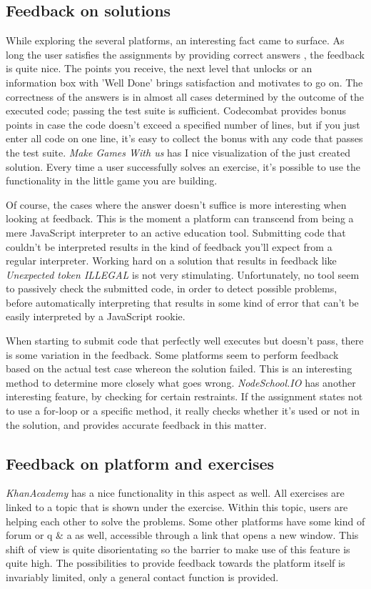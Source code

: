\documentclass{article}
\begin{document}
\subsection{Feedback on solutions}
While exploring the several platforms, an interesting fact came to
surface. As long the user satisfies the assignments by providing correct answers
, the feedback is quite nice. The points you receive, the next level that
unlocks or an information box with 'Well Done' brings satisfaction and motivates
to go on. The correctness of the answers is in almost all cases determined by
the outcome of the executed code; passing the test suite is sufficient.
Codecombat provides bonus points in case the code doesn't exceed a specified 
number of lines, but if you just enter all code on one line, it's easy to 
collect the bonus with any code that passes the test suite. 
{\em Make Games With us} has I nice
visualization of the just created solution. Every time a user successfully solves
an exercise, it's possible to use the functionality in the little game you are
building.


Of course, the cases where the answer doesn't suffice is more interesting when
looking at feedback. This is the moment a platform can transcend from being a
mere JavaScript interpreter to an active education tool. Submitting code that 
couldn't be interpreted results in the kind of feedback you'll expect from a 
regular interpreter. Working hard on a solution that results in feedback like 
{\em Unexpected token ILLEGAL} is not very stimulating. Unfortunately, no tool 
seem to passively check the submitted code, in order to detect possible
problems, before automatically interpreting that results in some kind of error
that can't be easily interpreted by a JavaScript rookie. 


When starting to submit code that perfectly well executes but doesn't
pass, there is
some variation in the feedback. Some platforms seem to perform feedback based 
on the actual test case whereon the solution failed. This is an interesting 
method to determine more closely what goes wrong. {\em NodeSchool.IO} has another 
interesting feature, by checking for certain restraints. If the assignment 
states not to use a for-loop or a specific method, it really checks whether 
it's used or not in the solution, and provides accurate feedback in this matter.

\subsection{Feedback on platform and exercises}
{\em KhanAcademy} has a nice functionality in this aspect as well. All exercises are 
linked to a topic that is shown under the exercise. Within this topic, users are 
helping each other to solve the problems. Some other platforms have some kind
of forum or q \& a as well, accessible through a link that opens a new window. 
This shift of view is quite disorientating so the barrier to make use 
of this feature is quite high. The possibilities to provide feedback towards the 
platform itself is invariably limited, only a general contact function is 
provided. 
\end{document}
